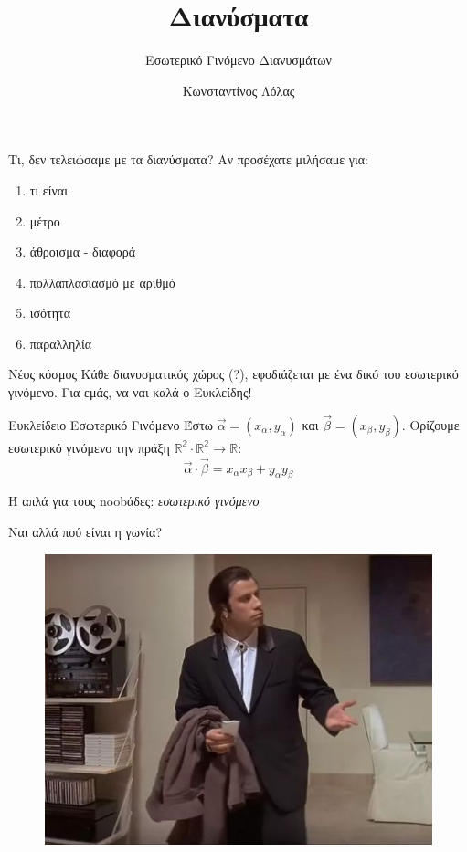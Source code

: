 \documentclass{../../presentation}
\title{Διανύσματα}
\subtitle{Εσωτερικό Γινόμενο Διανυσμάτων}
\author[Λόλας]{Κωνσταντίνος Λόλας}
\institute[$10^ο$ ΓΕΛ]{$10^ο$ ΓΕΛ Θεσσαλονίκης}
\date{}
\begin{document}
\begin{frame}
  \titlepage
\end{frame}
\begin{frame}{Τι, δεν τελειώσαμε με τα διανύσματα?}
  Αν προσέχατε μιλήσαμε για:
  \begin{enumerate}
    \item τι είναι
    \item μέτρο
    \item άθροισμα - διαφορά
    \item πολλαπλασιασμό με αριθμό
    \item ισότητα
    \item παραλληλία
  \end{enumerate}
\end{frame}

\begin{frame}{Νέος κόσμος}
  Κάθε διανυσματικός χώρος (?), εφοδιάζεται με ένα δικό του εσωτερικό γινόμενο. Για εμάς, να ναι καλά ο Ευκλείδης!
  \begin{block}{Ευκλείδειο Εσωτερικό Γινόμενο}
    Έστω $\vec{α}=(x_α,y_α)$ και $\vec{β}=(x_β,y_β)$. Ορίζουμε εσωτερικό γινόμενο την πράξη $\mathbb{R^2}\cdot\mathbb{R^2}\to\mathbb{R}$:
    $$\vec{α}\cdot\vec{β}=x_αx_β+y_αy_β$$
  \end{block}
  Ή απλά για τους noobάδες: \emph{εσωτερικό γινόμενο}
\end{frame}

\begin{frame}{Ναι αλλά πού είναι η γωνία?}
  \begin{figure}
    \centering
    \includegraphics[width=0.8 \textwidth]{"../images/missing"}
  \end{figure}
\end{frame}
\end{document}
